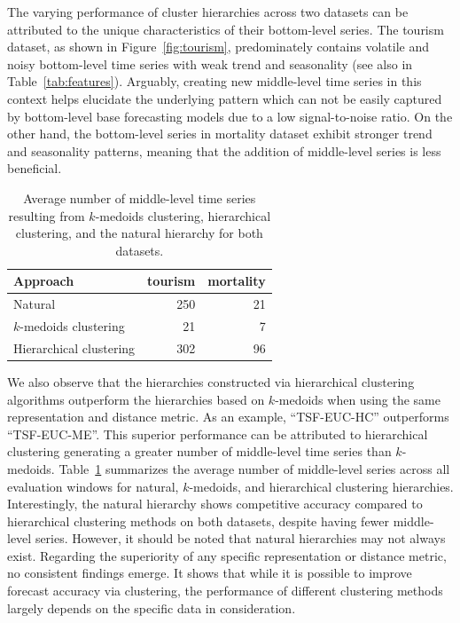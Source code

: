 \documentclass[a4paper,review,12pt,authoryear]{elsarticle}
\begin{document}
The varying performance of cluster hierarchies across two datasets can be attributed to the unique characteristics of their bottom-level series.
The tourism dataset, as shown in Figure~\ref{fig:tourism}, predominately contains volatile and noisy bottom-level time series with weak trend and seasonality (see also in  Table~\ref{tab:features}). Arguably, creating new middle-level time series in this context helps elucidate the underlying pattern which can not be easily captured by bottom-level base forecasting models due to a low signal-to-noise ratio. 
On the other hand, the bottom-level series in mortality dataset exhibit stronger trend and seasonality patterns, meaning that the addition of middle-level series is less beneficial.

\begin{table}[h!]
    \centering
    \caption{\label{tab:P3_number_series}Average number of middle-level time series resulting from $k$-medoids clustering, hierarchical clustering, and the natural hierarchy for both datasets.}
    \begin{tabular}{lrr}
    \toprule
        Approach &  tourism& mortality \\ \midrule
     Natural &250  & 21 \\ 
        $k$-medoids clustering &  21&  7\\ 
        Hierarchical clustering &302   & 96\\ \bottomrule
    \end{tabular}
\end{table}

We also observe that the hierarchies constructed via hierarchical clustering algorithms outperform the hierarchies based on $k$-medoids when using the same representation and distance metric. As an example, ``TSF-EUC-HC'' outperforms ``TSF-EUC-ME''.
This superior performance can be attributed to hierarchical clustering generating a greater number of middle-level time series than $k$-medoids.
Table~\ref{tab:P3_number_series} summarizes the average number of middle-level series across all evaluation windows for natural, $k$-medoids, and hierarchical clustering hierarchies. 
Interestingly, the natural hierarchy shows competitive accuracy compared to hierarchical clustering methods on both datasets, despite having fewer middle-level series. However, it should be noted that natural hierarchies may not always exist. Regarding the superiority of any specific representation or distance metric, no consistent findings emerge. It shows that while it is possible to improve forecast accuracy via clustering, the performance of different clustering methods largely depends on the specific data in consideration.
\end{document}
